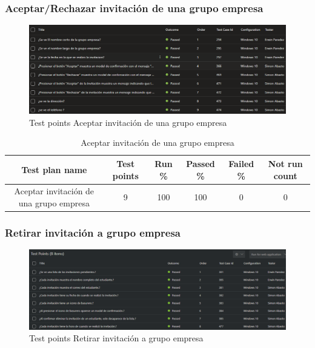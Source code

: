 \documentclass[12pt,letterpaper]{article}
\begin{document}
\subsubsection{Aceptar/Rechazar invitación de una grupo empresa}

\begin{figure}[H]
        \centering
        \includegraphics[width=1\linewidth]{cases aceptar inivtacion de un grupo empresa.png}
        \caption{Test points Aceptar invitación de una grupo empresa}
    \end{figure}


 \begin{table}[h] %
    \centering %
    \caption{Aceptar invitación de una grupo empresa} %
    \begin{tabular}{|c|c|c|c|c|c|}
        \rowcolor{green} %
        \hline
        Test plan name & Test points & Run \% & Passed \% & Failed \% & Not run count \\
        \hline
        Aceptar invitación de una grupo empresa& 9 & 100 & 100 & 0 & 0 \\
        \hline
    \end{tabular}
\end{table}



\subsubsection{Retirar invitación a grupo empresa}
\begin{figure}[H]
        \centering
        \includegraphics[width=1\linewidth]{cases retirar invitacion a grupos empresa.png}
        \caption{Test points Retirar invitación a grupo empresa}
    \end{figure}
\end{document}
